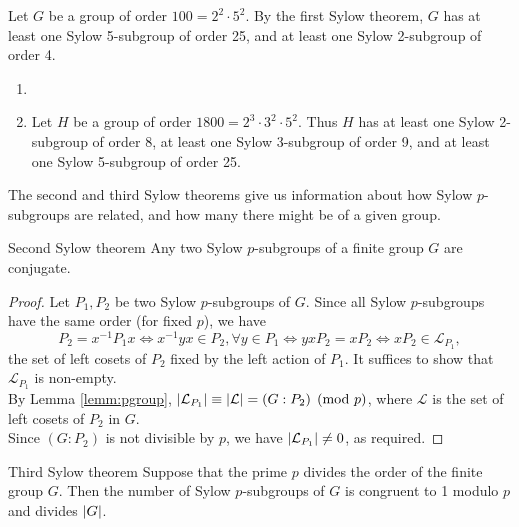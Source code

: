 \begin{examples}{}{}
\exstart Let $G$ be a group of order $100=2^2\cdot 5^2$. By the first Sylow theorem, $G$ has at least one Sylow 5-subgroup of order 25, and at least one Sylow 2-subgroup of order 4.
\begin{enumerate}
\item 
\item Let $H$ be a group of order $1800=2^3\cdot 3^2\cdot 5^2$. Thus $H$ has at least one Sylow 2-subgroup of order 8, at least one Sylow 3-subgroup of order 9, and at least one Sylow 5-subgroup of order 25.
\end{enumerate}
\end{examples}

The second and third Sylow theorems give us information about how Sylow $p$-subgroups are related, and how many there might be of a given group.

\begin{thm}{Second Sylow theorem}{}
Any two Sylow $p$-subgroups of a finite group $G$ are conjugate.
\end{thm}

\begin{proof}
Let $P_1,P_2$ be two Sylow $p$-subgroups of $G$. Since all Sylow $p$-subgroups have the same order (for fixed $p$), we have
\[P_2=x^{-1}P_1x\iff x^{-1}yx\in P_2, \forall y\in P_1\iff yxP_2=xP_2\iff xP_2\in\mathcal L_{P_1},\]
the set of left cosets of $P_2$ fixed by the left action of $P_1$. It suffices to show that $\mathcal L_{P_1}$ is non-empty.\\
By Lemma \ref{lemm:pgroup}, $\left| \mathcal L_{P_1}\right|\equiv\left| \mathcal L\right|=(G:P_2)\pmod p$, where $\mathcal L$ is the set of left cosets of $P_2$ in $G$.\\
Since $(G:P_2)$ is not divisible by $p$, we have $\left| \mathcal L_{P_1}\right|\neq 0$, as required.
\end{proof}

\begin{thm}{Third Sylow theorem}{}
Suppose that the prime $p$ divides the order of the finite group $G$. Then the number of Sylow $p$-subgroups of $G$ is congruent to 1 modulo $p$ and divides $\left| G\right|$.
\end{thm}

